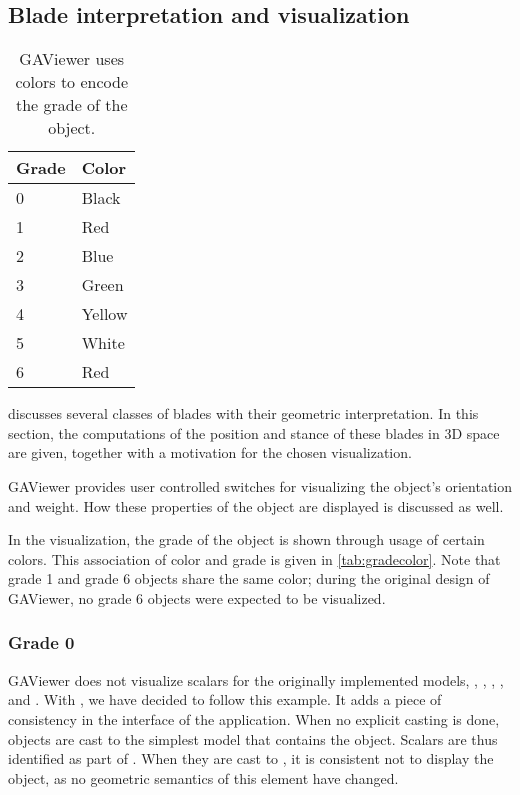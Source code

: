 \subsection{Blade interpretation and visualization}
\begin{table}
  \caption{GAViewer uses colors to encode the grade of the object.}
  \label{tab:gradecolor}
  \begin{center}
    \begin{tabular}{|l|l|}
      \hline
      Grade & Color \\
      \hline
      \hline
      0 & Black \\
      1 & Red \\
      2 & Blue \\
      3 & Green \\
      4 & Yellow \\
      5 & White \\
      6 & Red \\
      \hline
    \end{tabular}
  \end{center}
\end{table}

 discusses several classes of blades with their geometric interpretation.  In this section, the computations of the position and stance of these blades in 3D space are given, together with a motivation for the chosen visualization.  

GAViewer provides user controlled switches for visualizing the object's orientation and weight.  How these properties of the object are displayed is discussed as well.

In the visualization, the grade of the object is shown through usage of certain colors.  This association of color and grade is given in \autoref{tab:gradecolor}.  Note that grade 1 and grade 6 objects share the same color; during the original design of GAViewer, no grade 6 objects were expected to be visualized.

\subsubsection{Grade 0}
GAViewer does not visualize scalars for the originally implemented models, \ega{}, \pga{}, \cga{}, \cbga{}, and \iga.  With \lga{}, we have decided to follow this example.  It adds a piece of consistency in the interface of the application.  When no explicit casting is done, objects are cast to the simplest model that contains the object.  Scalars are thus identified as part of \ega{}.  When they are cast to \lga{}, it is consistent not to display the object, as no geometric semantics of this element have changed.


